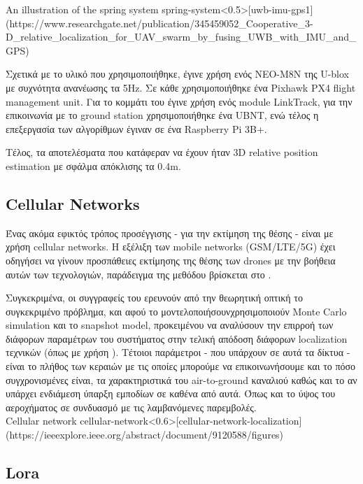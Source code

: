 {An illustration of the spring system}
{spring-system}<0.5>[uwb-imu-gps1](https://www.researchgate.net/publication/345459052_Cooperative_3-D_relative_localization_for_UAV_swarm_by_fusing_UWB_with_IMU_and_GPS)

Σχετικά με το υλικό που χρησιμοποιήθηκε, έγινε χρήση ενός NEO-M8N  της U-blox με συχνότητα ανανέωσης τα 5Hz.  
Σε κάθε  χρησιμοποιήθηκε ένα Pixhawk PX4 flight management unit. Για το κομμάτι του  έγινε χρήση
ενός module LinkTrack, για την επικοινωνία με το ground station χρησιμοποιήθηκε ένα UBNT, ενώ τέλος η επεξεργασία των 
αλγορίθμων έγιναν σε ένα Raspberry Pi 3B+. 

Τέλος, τα αποτελέσματα που κατάφεραν να έχουν ήταν 3D relative position estimation με σφάλμα απόκλισης τα 0.4m. 

\subsection{Cellular Networks}
Ένας ακόμα εφικτός τρόπος προσέγγισης - για την εκτίμηση της θέσης - είναι με χρήση
cellular networks. Η εξέλιξη των mobile networks (GSM/LTE/5G) έχει οδηγήσει να γίνουν προσπάθειες εκτίμησης
της θέσης των drones με την βοήθεια αυτών των τεχνολογιών, παράδειγμα της μεθόδου βρίσκεται στο . 

Συγκεκριμένα, οι συγγραφείς του \cite{cellular-network-localization} ερευνούν από την θεωρητική οπτική το συ\-γκε\-κρι\-μένο πρόβλημα, 
και αφού το μοντελοποιήσουν\udot χρησιμοποιούν Monte Carlo simulation και το snapshot model, προκειμένου να αναλύσουν την επιρροή 
των διάφορων παραμέτρων του συστήματος στην τελική απόδοση διάφορων localization τεχνικών (όπως με χρήση ). Τέτοιοι 
παράμετροι - που υπάρχουν σε αυτά τα δίκτυα - είναι το πλήθος των κεραιών με τις οποίες μπορούμε να επικοινωνήσουμε και το πόσο συγχρονισμένες 
είναι, τα χαρακτηριστικά του air-to-ground καναλιού καθώς και το αν υπάρχει ενδιάμεση ύπαρξη εμποδίων σε καθένα από αυτά. Όπως και το 
ύψος του αεροχήματος σε συνδυασμό με τις λαμβανόμενες παρεμβολές.
\\[0.3cm]

{Cellular network}
{cellular-network}<0.6>[cellular-network-localization](https://ieeexplore.ieee.org/abstract/document/9120588/figures)

\subsection{Lora}

